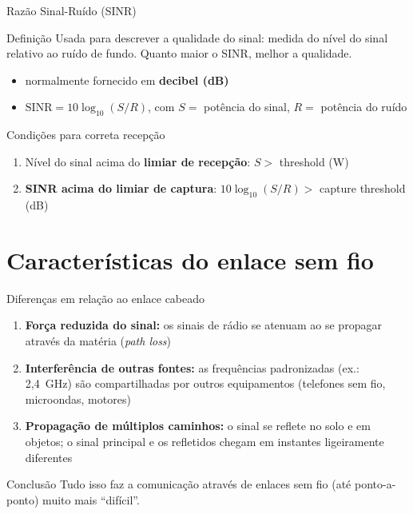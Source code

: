 \documentclass[aspectratio=169,11pt]{beamer}
\begin{document}
\begin{frame}{Razão Sinal-Ruído (SINR)}
  \begin{block}{Definição}
    Usada para descrever a qualidade do sinal: medida do nível do sinal relativo ao ruído de fundo.
    Quanto maior o SINR, melhor a qualidade.
    \begin{itemize}
      \item normalmente fornecido em \textbf{decibel (dB)}
      \item $\mathrm{SINR} = 10\log_{10}(S/R)$, com $S=$ potência do sinal, $R=$ potência do ruído
    \end{itemize}
  \end{block}
  \begin{block}{Condições para correta recepção}
    \begin{enumerate}
      \item Nível do sinal acima do \textbf{limiar de recepção}: $S >$ threshold (W)
      \item \textbf{SINR acima do limiar de captura}: $10\log_{10}(S/R) >$ capture threshold (dB)
    \end{enumerate}
  \end{block}
\end{frame}

\section{Características do enlace sem fio}

\begin{frame}{Diferenças em relação ao enlace cabeado}
  \begin{enumerate}
    \item \textbf{Força reduzida do sinal:} os sinais de rádio se atenuam ao se propagar através da matéria (\emph{path loss})
    \item \textbf{Interferência de outras fontes:} as frequências padronizadas (ex.: 2,4~GHz) são compartilhadas por outros equipamentos (telefones sem fio, microondas, motores)
    \item \textbf{Propagação de múltiplos caminhos:} o sinal se reflete no solo e em objetos; o sinal principal e os refletidos chegam em instantes ligeiramente diferentes
  \end{enumerate}
  \begin{alertblock}{Conclusão}
    Tudo isso faz a comunicação através de enlaces sem fio (até ponto-a-ponto) muito mais ``difícil''.
  \end{alertblock}
\end{frame}
\end{document}
